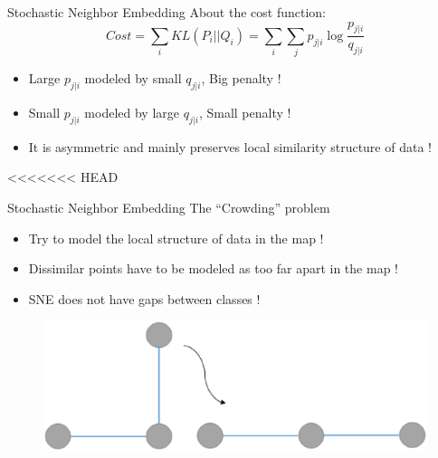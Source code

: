 \documentclass[10pt]{beamer}
\begin{document}
\begin{frame}{Stochastic Neighbor Embedding}
About the cost function:
\begin{displaymath}
	Cost = \sum_i KL(P_i||Q_i) = \sum_i\sum_j p_{j|i} \log\frac{p_{j|i}}{q_{j|i}}
\end{displaymath}
\begin{itemize}
	\item Large $p_{j|i}$ modeled by small $q_{j|i}$, Big penalty !
	\item Small $p_{j|i}$ modeled by large $q_{j|i}$, Small penalty ! 
	\item It is asymmetric and mainly preserves local similarity structure of data !
\end{itemize}
<<<<<<< HEAD
\end{frame}

\begin{frame}{Stochastic Neighbor Embedding}
The ``Crowding'' problem
\begin{itemize}
	\item Try to model the local structure of data in the map !
	\item Dissimilar points have to be modeled  as too far apart in the map !
	\item SNE does not have gaps between classes !
\end{itemize}
\begin{figure}
\centering
\includegraphics[scale=0.35]{./image/tsne1.eps}
\end{figure}
\end{frame}
\end{document}
